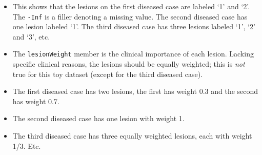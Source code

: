 \documentclass[
]{book}
\newenvironment{Shaded}{\begin{snugshade}}{\end{snugshade}}
\newcommand{\CommentTok}[1]{\textcolor[rgb]{0.56,0.35,0.01}{\textit{#1}}}
\newcommand{\NormalTok}[1]{#1}
\newcommand{\SpecialCharTok}[1]{\textcolor[rgb]{0.00,0.00,0.00}{#1}}
\begin{document}
\begin{Shaded}
\end{Shaded}

\begin{itemize}
\item
  This shows that the lesions on the first diseased case are labeled `1' and `2'. The \texttt{-Inf} is a filler denoting a missing value. The second diseased case has one lesion labeled `1'. The third diseased case has three lesions labeled `1', `2' and `3', etc.
\item
  The \texttt{lesionWeight} member is the clinical importance of each lesion. Lacking specific clinical reasons, the lesions should be equally weighted; this is \emph{not} true for this toy dataset (except for the third diseased case).
\end{itemize}

\begin{Shaded}
\end{Shaded}

\begin{itemize}
\item
  The first diseased case has two lesions, the first has weight 0.3 and the second has weight 0.7.
\item
  The second diseased case has one lesion with weight 1.
\item
  The third diseased case has three equally weighted lesions, each with weight 1/3. Etc.
\end{itemize}
\end{document}
